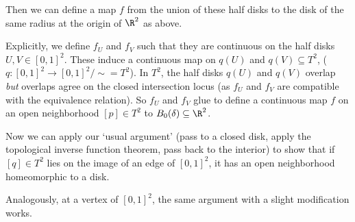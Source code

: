 \begin{example}
\begin{center}
        

    \end{center}

Then we can define a map $f$ from the union of these half disks to the disk of the same radius at the origin of $\R^2$ as above. 

Explicitly, we define $f_U$ and $f_V$ such that they are continuous on the half disks $U, V \in [0, 1]^2$. These induce a continuous map on $q(U)$ and $q(V) \subseteq T^2$, ($q: [0, 1]^2 \rightarrow [0, 1]^2/\sim = T^2$). In $T^2$, the half disks $q(U)$ and $q(V)$ overlap \emph{but} overlaps agree on the closed intersection locus (as $f_U$ and $f_V$ are compatible with the equivalence relation). So $f_U$ and $f_V$ glue to define a continuous map $f$ on an open neighborhood $[p] \in T^2$ to $B_0(\delta) \subseteq \R^2$.

Now we can apply our `usual argument' (pass to a closed disk, apply the topological inverse function theorem, pass back to the interior) to show that if $[q] \in T^2$ lies on the image of an edge of $[0, 1]^2$, it has an open neighborhood homeomorphic to a disk.

Analogously, at a vertex of $[0, 1]^2$, the same argument with a slight modification works.
\begin{center}
    


\begin{tikzpicture}[x=0.75pt,y=0.75pt,yscale=-1,xscale=1]


\end{tikzpicture}
\end{center}
\end{example}
